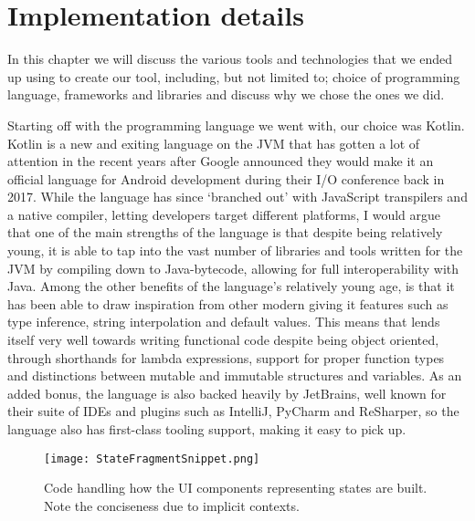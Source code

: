 \section{Implementation details}\label{sec:impl}

In this chapter we will discuss the various tools and technologies that we ended up using to create our tool, including, but not limited to; choice of programming language, frameworks and libraries and discuss why we chose the ones we did.

Starting off with the programming language we went with, our choice was Kotlin. Kotlin is a new and exiting language on the JVM that has gotten a lot of attention in the recent years after Google announced they would make it an official language for Android development during their I/O conference back in 2017. While the language has since `branched out' with JavaScript transpilers and a native compiler, letting developers target different platforms, I would argue that one of the main strengths of the language is that despite being relatively young, it is able to tap into the vast number of libraries and tools written for the JVM by compiling down to Java-bytecode, allowing for full interoperability with Java. Among the other benefits of the language's relatively young age, is that it has been able to draw inspiration from other modern giving it features such as type inference, string interpolation and default values. This means that lends itself very well towards writing functional code despite being object oriented, through shorthands for lambda expressions, support for proper function types and distinctions between mutable and immutable structures and variables. As an added bonus, the language is also backed heavily by JetBrains, well known for their suite of IDEs and plugins such as IntelliJ, PyCharm and ReSharper, so the language also has first-class tooling support, making it easy to pick up. 

\begin{figure}[h]
	\label{fig:StatFragSnip}
	\texttt{[image: StateFragmentSnippet.png]}
	\caption{Code handling how the UI components representing states are built. Note the conciseness due to implicit contexts.}
\end{figure}

